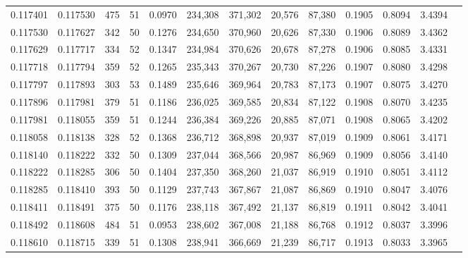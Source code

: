 \begin{tabular}{rrrrrrrrrrrrr}
0.117401 & 0.117530 &   475 &  51 &                                     0.0970 & 234,308 & 371,302 &  20,576 &  87,380 & 0.1905 & 0.8094 & 3.4394 \\
0.117530 & 0.117627 &   342 &  50 &                                     0.1276 & 234,650 & 370,960 &  20,626 &  87,330 & 0.1906 & 0.8089 & 3.4362 \\
0.117629 & 0.117717 &   334 &  52 &                                     0.1347 & 234,984 & 370,626 &  20,678 &  87,278 & 0.1906 & 0.8085 & 3.4331 \\
0.117718 & 0.117794 &   359 &  52 &                                     0.1265 & 235,343 & 370,267 &  20,730 &  87,226 & 0.1907 & 0.8080 & 3.4298 \\
0.117797 & 0.117893 &   303 &  53 &                                     0.1489 & 235,646 & 369,964 &  20,783 &  87,173 & 0.1907 & 0.8075 & 3.4270 \\
0.117896 & 0.117981 &   379 &  51 &                                     0.1186 & 236,025 & 369,585 &  20,834 &  87,122 & 0.1908 & 0.8070 & 3.4235 \\
0.117981 & 0.118055 &   359 &  51 &                                     0.1244 & 236,384 & 369,226 &  20,885 &  87,071 & 0.1908 & 0.8065 & 3.4202 \\
0.118058 & 0.118138 &   328 &  52 &                                     0.1368 & 236,712 & 368,898 &  20,937 &  87,019 & 0.1909 & 0.8061 & 3.4171 \\
0.118140 & 0.118222 &   332 &  50 &                                     0.1309 & 237,044 & 368,566 &  20,987 &  86,969 & 0.1909 & 0.8056 & 3.4140 \\
0.118222 & 0.118285 &   306 &  50 &                                     0.1404 & 237,350 & 368,260 &  21,037 &  86,919 & 0.1910 & 0.8051 & 3.4112 \\
0.118285 & 0.118410 &   393 &  50 &                                     0.1129 & 237,743 & 367,867 &  21,087 &  86,869 & 0.1910 & 0.8047 & 3.4076 \\
0.118411 & 0.118491 &   375 &  50 &                                     0.1176 & 238,118 & 367,492 &  21,137 &  86,819 & 0.1911 & 0.8042 & 3.4041 \\
0.118492 & 0.118608 &   484 &  51 &                                     0.0953 & 238,602 & 367,008 &  21,188 &  86,768 & 0.1912 & 0.8037 & 3.3996 \\
0.118610 & 0.118715 &   339 &  51 &                                     0.1308 & 238,941 & 366,669 &  21,239 &  86,717 & 0.1913 & 0.8033 & 3.3965 \\

\end{tabular}
